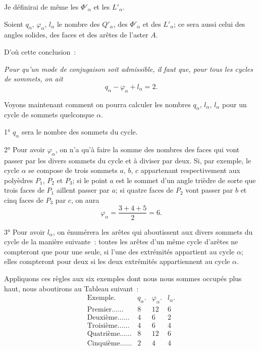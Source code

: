 \documentclass{article}
\begin{document}
Je définirai de même les $\Phi'_{\alpha}$ et les $L'_{\alpha}$.

Soient $q_{\alpha}$, $\varphi_{\alpha}$, $l_{\alpha}$ le nombre des $Q'_{\alpha}$, des $\Phi'_{\alpha}$ et des $L'_{\alpha}$; ce sera aussi celui des angles solides, des faces et des arêtes de l'aster $A$.

D'où cette conclusion~:

\emph{Pour qu'un mode de conjugaison soit admissible, il faut que, pour tous les cycles de sommets, on ait}
\[ q_{\alpha} - \varphi_{\alpha} + l_{\alpha} = 2. \]

Voyons maintenant comment on pourra calculer les nombres $q_{\alpha}$, $l_{\alpha}$, $l_{\alpha}$ pour un cycle de sommets quelconque $\alpha$.

1° $q_{\alpha}$ sera le nombre des sommets du cycle.

2° Pour avoir $\varphi_{\alpha}$, on n'a qu'à faire la somme des nombres des faces qui vont passer par les divers sommets du cycle et à diviser par deux. Si,
par exemple, le cycle $\alpha$ se compose de trois sommets $a$, $b$, $c$ appartenant respectivement aux polyèdres $P_{1}$, $P_{2}$ et $P_{3}$; si le point $a$ est le sommet d'un angle trièdre de sorte que trois faces de $P_{1}$ aillent passer par $a$; si quatre faces de $P_{2}$ vont passer par $b$ et cinq faces de $P_{3}$ par $c$, on aura
\[ \varphi_{\alpha} = \frac{3 + 4 + 5}{2} = 6. \]

3° Pour avoir $l_{\alpha}$, on énumérera les arêtes qui aboutissent aux divers sommets du cycle de la manière suivante~: toutes les arêtes d'un même cycle d'arêtes ne compteront que pour une seule, si l'une des extrémités appartient au cycle $\alpha$; elles compteront pour deux si les deux extrémités appartiennent au cycle $\alpha$.

Appliquons ces règles aux six exemples dont nous nous sommes occupés plus haut, nous aboutirons au Tableau suivant~:
\[ \begin{matrix} \text{Exemple.} & q_{\alpha}. & \varphi_{\alpha}. & l_{\alpha}. \\[1ex] \text{Premier}\ldots\ldots & 8 & 12 & 6 \\[1ex] \text{Deuxième}\ldots\ldots & 4 & 6 & 2 \\[1ex] \text{Troisième}\ldots\ldots & 4 & 6 & 4 \\[1ex] \text{Quatrième}\ldots\ldots & 8 & 12 & 6 \\[1ex] \text{Cinquième}\ldots\ldots & 2 & 4 & 4 \end{matrix} \]
\end{document}
